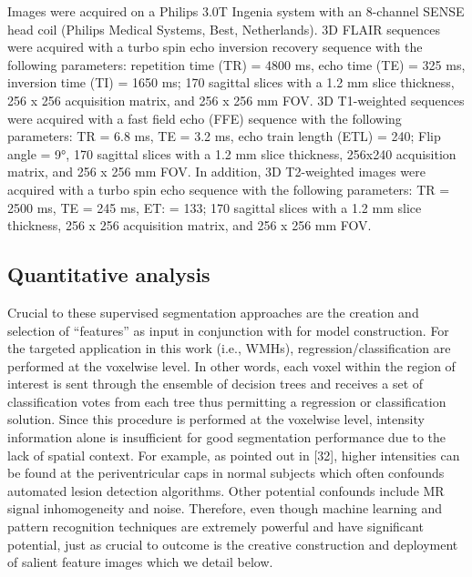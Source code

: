 \documentclass[11pt,]{article}
\begin{document}
Images were acquired on a Philips 3.0T Ingenia system with an 8-channel
SENSE head coil (Philips Medical Systems, Best, Netherlands). 3D FLAIR
sequences were acquired with a turbo spin echo inversion recovery
sequence with the following parameters: repetition time (TR) = 4800 ms,
echo time (TE) = 325 ms, inversion time (TI) = 1650 ms; 170 sagittal
slices with a 1.2 mm slice thickness, 256 x 256 acquisition matrix, and
256 x 256 mm FOV. 3D T1-weighted sequences were acquired with a fast
field echo (FFE) sequence with the following parameters: TR = 6.8 ms, TE
= 3.2 ms, echo train length (ETL) = 240; Flip angle = 9°, 170 sagittal
slices with a 1.2 mm slice thickness, 256x240 acquisition matrix, and
256 x 256 mm FOV. In addition, 3D T2-weighted images were acquired with
a turbo spin echo sequence with the following parameters: TR = 2500 ms,
TE = 245 ms, ET: = 133; 170 sagittal slices with a 1.2 mm slice
thickness, 256 x 256 acquisition matrix, and 256 x 256 mm FOV.

\subsection{Quantitative analysis}\label{quantitative-analysis}

Crucial to these supervised segmentation approaches are the creation and
selection of ``features'' as input in conjunction with
 for model
construction. For the targeted application in this work (i.e., WMHs),
regression/classification are performed at the voxelwise level. In other
words, each voxel within the region of interest is sent through the
ensemble of decision trees and receives a set of classification votes
from each tree thus permitting a regression or classification solution.
Since this procedure is performed at the voxelwise level, intensity
information alone is insufficient for good segmentation performance due
to the lack of spatial context. For example, as pointed out in {[}32{]},
higher intensities can be found at the periventricular caps in normal
subjects which often confounds automated lesion detection algorithms.
Other potential confounds include MR signal inhomogeneity and noise.
Therefore, even though machine learning and pattern recognition
techniques are extremely powerful and have significant potential, just
as crucial to outcome is the creative construction and deployment of
salient feature images which we detail below.
\end{document}
